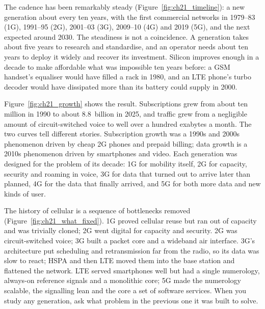 
The cadence has been remarkably steady (Figure~\ref{fig:ch21_timeline}): a new generation about
every ten years, with the first commercial networks in 1979--83 (1G), 1991--95 (2G), 2001--03 (3G),
2009--10 (4G) and 2019 (5G), and the next expected around 2030. The steadiness is not a
coincidence. A generation takes about five years to research and standardise, and an operator needs
about ten years to deploy it widely and recover its investment. Silicon improves enough in a decade
to make affordable what was impossible ten years before: a GSM handset's equaliser would have
filled a rack in 1980, and an LTE phone's turbo decoder would have dissipated more than its battery
could supply in 2000.


Figure~\ref{fig:ch21_growth} shows the result. Subscriptions grew from about ten million in 1990 to
about 8.8~billion in 2025, and traffic grew from a negligible amount of circuit-switched voice to
well over a hundred exabytes a month. The two curves tell different stories. Subscription growth
was a 1990s and 2000s phenomenon driven by cheap 2G phones and prepaid billing; data growth is a
2010s phenomenon driven by smartphones and video. Each generation was designed for the problem of
its decade: 1G for mobility itself, 2G for capacity, security and roaming in voice, 3G for data
that turned out to arrive later than planned, 4G for the data that finally arrived, and 5G for both
more data and new kinds of user.

\begin{keyidea}
The history of cellular is a sequence of bottlenecks removed (Figure~\ref{fig:ch21_what_fixed}).
1G proved cellular reuse but ran out of capacity and was trivially cloned; 2G went digital for
capacity and security. 2G was circuit-switched voice; 3G built a packet core and a wideband air
interface. 3G's architecture put scheduling and retransmission far from the radio, so its data was
slow to react; HSPA and then LTE moved them into the base station and flattened the network. LTE
served smartphones well but had a single numerology, always-on reference signals and a monolithic
core; 5G made the numerology scalable, the signalling lean and the core a set of software services.
When you study any generation, ask what problem in the previous one it was built to solve.
\end{keyidea}

